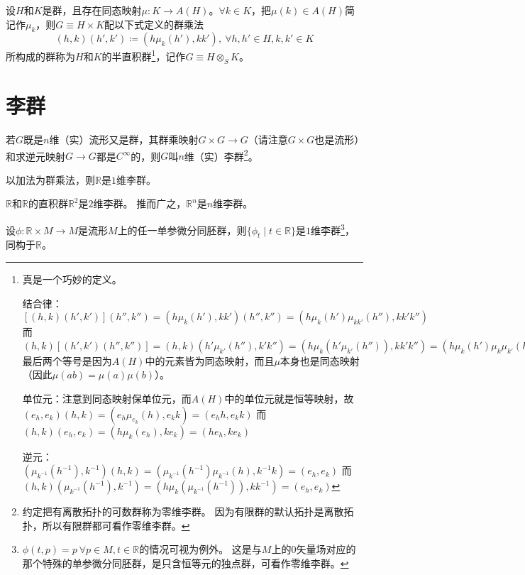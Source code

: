 \begin{definition}
    设$H$和$K$是群，且存在同态映射$\mu \colon K \to A(H)$。$\forall k \in K$，把$\mu(k) \in A(H)$简记作$\mu_k$，则$G \equiv H \times K$配以下式定义的群乘法
    $$(h, k)(h', k') \coloneq (h\mu_k(h'), kk'), ~ \forall h,h' \in H, k, k' \in K$$
    所构成的群称为$H$和$K$的半直积群\footnote{
        真是一个巧妙的定义。
        
        结合律：$[(h, k)(h', k')](h'', k'') = (h\mu_k(h'), kk')(h'', k'') = (h\mu_k(h')\mu_{kk'}(h''), kk'k'')$
        而$(h, k)[(h', k')(h'', k'')] = (h, k)(h'\mu_{k'}(h''), k'k'') = (h\mu_k(h'\mu_{k'}(h'')), kk'k'') = (h\mu_k(h')\mu_k\mu_{k'}(h''), kk'k'') = (h\mu_k(h')\mu_{kk'}(h''), kk'k'')$
        最后两个等号是因为$A(H)$中的元素皆为同态映射，而且$\mu$本身也是同态映射（因此$\mu(ab) = \mu(a)\mu(b)$）。

        单位元：注意到同态映射保单位元，而$A(H)$中的单位元就是恒等映射，故$(e_h, e_k)(h, k) = (e_h\mu_{e_k}(h), e_kk) = (e_hh, e_kk)$
        而$(h, k)(e_h, e_k) = (h\mu_k(e_h), ke_k) = (he_h, ke_k)$

        逆元：$(\mu_{k^{-1}}(h^{-1}), k^{-1})(h, k) = (\mu_{k^{-1}}(h^{-1})\mu_{k^{-1}}(h), k^{-1}k) = (e_h, e_k)$
        而$(h, k)(\mu_{k^{-1}}(h^{-1}), k^{-1}) = (h\mu_k(\mu_{k^{-1}}(h^{-1})), kk^{-1}) = (e_h, e_k)$
    }，记作$G \equiv H \otimes_S K$。
\end{definition}

\section{李群}

\begin{definition}
    若$G$既是$n$维（实）流形又是群，其群乘映射$G \times G \to G$（请注意$G \times G$也是流形）和求逆元映射$G \to G$都是$C^\infty$的，则$G$叫$n$维（实）李群\footnote{
        约定把有离散拓扑的可数群称为零维李群。
        因为有限群的默认拓扑是离散拓扑，所以有限群都可看作零维李群。
    }。
\end{definition}

\begin{example}
    以加法为群乘法，则$\mathbb{R}$是$1$维李群。
\end{example}

\begin{example}
    $\mathbb{R}$和$\mathbb{R}$的直积群$\mathbb{R}^2$是$2$维李群。
    推而广之，$\mathbb{R}^n$是$n$维李群。
\end{example}

\begin{example}
    设$\phi \colon \mathbb{R} \times M \to M$是流形$M$上的任一单参微分同胚群，则$\{\phi_t \mid t \in \mathbb{R}\}$是$1$维李群\footnote{
        $\phi(t, p) = p ~ \forall p \in M, t \in \mathbb{R}$的情况可视为例外。
        这是与$M$上的$0$矢量场对应的那个特殊的单参微分同胚群，是只含恒等元的独点群，可看作零维李群。
    }，同构于$\mathbb{R}$。
\end{example}

